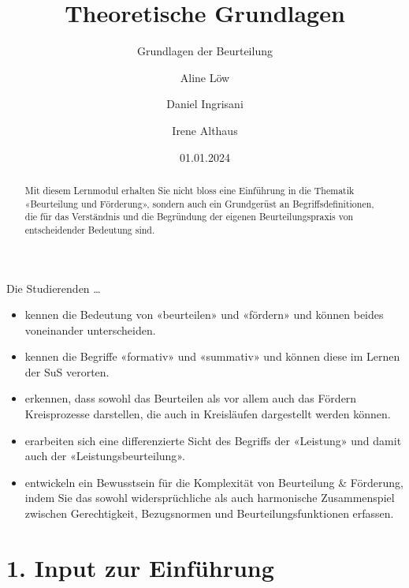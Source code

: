 \documentclass[
  10pt,
  a4paper,
  DIV=11]{scrartcl}
\title{Theoretische Grundlagen}
\subtitle{Grundlagen der Beurteilung}
\author{Aline Löw \and Daniel Ingrisani \and Irene Althaus}
\date{01.01.2024}
\providecommand{\tightlist}{%
  \setlength{\itemsep}{0pt}\setlength{\parskip}{0pt}}\usepackage{longtable,booktabs,array}
\begin{document}
\maketitle
\begin{abstract}
Mit diesem Lernmodul erhalten Sie nicht bloss eine Einführung in die
Thematik «Beurteilung und Förderung», sondern auch ein Grundgerüst an
Begriffsdefinitionen, die für das Verständnis und die Begründung der
eigenen Beurteilungspraxis von entscheidender Bedeutung sind.
\end{abstract}

\begin{tcolorbox}[enhanced jigsaw, colframe=quarto-callout-note-color-frame, toptitle=1mm, title=\textcolor{quarto-callout-note-color}{\faInfo}\hspace{0.5em}{Ziele des Lernmoduls}, left=2mm, breakable, opacitybacktitle=0.6, leftrule=.75mm, colbacktitle=quarto-callout-note-color!10!white, colback=white, coltitle=black, toprule=.15mm, arc=.35mm, bottomtitle=1mm, bottomrule=.15mm, titlerule=0mm, rightrule=.15mm, opacityback=0]

Die Studierenden \ldots{}

\begin{itemize}
\tightlist
\item
  kennen die Bedeutung von «beurteilen» und «fördern» und können beides
  voneinander unterscheiden.
\item
  kennen die Begriffe «formativ» und «summativ» und können diese im
  Lernen der SuS verorten.
\item
  erkennen, dass sowohl das Beurteilen als vor allem auch das Fördern
  Kreisprozesse darstellen, die auch in Kreisläufen dargestellt werden
  können.
\item
  erarbeiten sich eine differenzierte Sicht des Begriffs der «Leistung»
  und damit auch der «Leistungsbeurteilung».
\item
  entwickeln ein Bewusstsein für die Komplexität von Beurteilung \&
  Förderung, indem Sie das sowohl widersprüchliche als auch harmonische
  Zusammenspiel zwischen Gerechtigkeit, Bezugsnormen und
  Beurteilungsfunktionen erfassen.
\end{itemize}

\end{tcolorbox}

\section{1. Input zur Einführung}\label{input-zur-einfuxfchrung}
\end{document}
